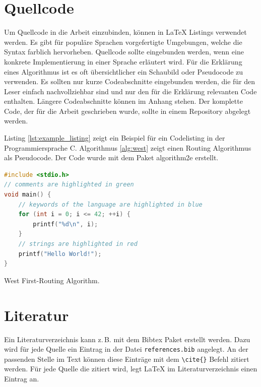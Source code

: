 \section{Quellcode}
Um Quellcode in die Arbeit einzubinden, können in \LaTeX{} Listings verwendet werden. Es gibt für populäre Sprachen vorgefertigte Umgebungen, welche die Syntax farblich hervorheben. Quellcode sollte eingebunden werden, wenn eine konkrete Implementierung in einer Sprache erläutert wird. Für die Erklärung eines Algorithmus ist es oft übersichtlicher ein Schaubild oder Pseudocode zu verwenden. Es sollten nur kurze Codeabschnitte eingebunden werden, die für den Leser einfach nachvollziehbar sind und nur den für die Erklärung relevanten Code enthalten. Längere Codeabschnitte können im Anhang stehen. Der komplette Code, der für die Arbeit geschrieben wurde, sollte in einem Repository abgelegt werden.

Listing \ref{lst:example_listing} zeigt ein Beispiel für ein Codelisting in der Programmiersprache C. Algorithmus \ref{alg:west} zeigt einen Routing Algorithmus als Pseudocode. Der Code wurde mit dem Paket algorithm2e erstellt.

\begin{lstlisting}[language=C, caption=Beispiel für ein Codelisting in der Sprache C., label=lst:example_listing]
#include <stdio.h>
// comments are highlighted in green
void main() {
    // keywords of the language are highlighted in blue
    for (int i = 0; i <= 42; ++i) {
        printf("%d\n", i);
    }
    // strings are highlighted in red
    printf("Hello World!");
}
\end{lstlisting}

\begin{algorithm}[ht]

 \caption{West First-Routing Algorithm.}
 \label{alg:west}
\end{algorithm}

\section{Literatur}
Ein Literaturverzeichnis kann z.\,B. mit dem Bibtex Paket erstellt werden. Dazu wird für jede Quelle ein Eintrag in der Datei \texttt{references.bib} angelegt. An der passenden Stelle im Text können diese Einträge mit dem \texttt{\textbackslash cite\{\}} Befehl zitiert werden. Für jede Quelle die zitiert wird, legt \LaTeX{}  im Literaturverzeichnis einen Eintrag an.

